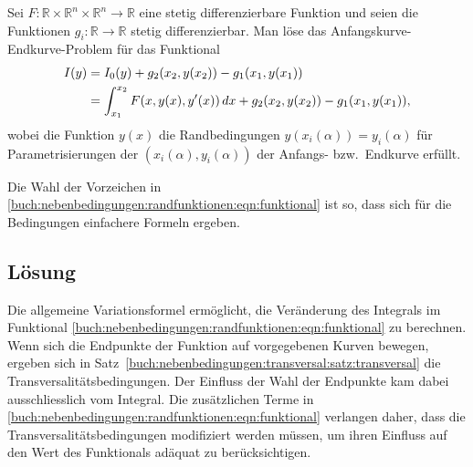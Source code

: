 \begin{aufgabe}
\label{buch:nebenbedingungen:randfunktionen:aufgabe}
Sei $F\colon\mathbb{R}\times\mathbb{R}^n \times\mathbb{R}^n\to\mathbb{R}$
eine stetig differenzierbare Funktion und seien die Funktionen 
$g_i\colon\mathbb{R}\to\mathbb{R}$ stetig differenzierbar.
Man löse das Anfangskurve-Endkurve-Problem für das Funktional
\begin{align}
I(y)
&=
I_0(y)
+
g_2(x_2,y(x_2))
-
g_1(x_1,y(x_1))
\notag
\\
&=
\int_{x_1}^{x_2}
F(x,y(x),y'(x))
\,dx
+
g_2(x_2,y(x_2))
-
g_1(x_1,y(x_1)),
\label{buch:nebenbedingungen:randfunktionen:eqn:funktional}
\end{align}
wobei die Funktion $y(x)$ die Randbedingungen
\(
y(x_i(\alpha)) = y_i(\alpha)
\)
für Parametrisierungen der $(x_i(\alpha),y_i(\alpha))$ der Anfangs-
bzw.~Endkurve erfüllt.
\end{aufgabe}

Die Wahl der Vorzeichen in 
\eqref{buch:nebenbedingungen:randfunktionen:eqn:funktional}
ist so, dass sich für die Bedingungen einfachere Formeln ergeben.

%
%
\subsection{Lösung
\label{buch:nebenbedingungen:randfunktionen:subsection:loesung}}
Die allgemeine Variationsformel ermöglicht, die Veränderung des
Integrals im Funktional
\eqref{buch:nebenbedingungen:randfunktionen:eqn:funktional}
zu berechnen.
Wenn sich die Endpunkte der Funktion auf vorgegebenen
Kurven bewegen, ergeben sich in
Satz~\ref{buch:nebenbedingungen:transversal:satz:transversal}
die Transversalitätsbedingungen.
Der Einfluss der Wahl der Endpunkte kam dabei ausschliesslich vom
Integral.
Die zusätzlichen Terme in
\eqref{buch:nebenbedingungen:randfunktionen:eqn:funktional}
verlangen daher, dass die Transversalitätsbedingungen modifiziert
werden müssen, um ihren Einfluss auf den Wert des Funktionals
adäquat zu berücksichtigen.

